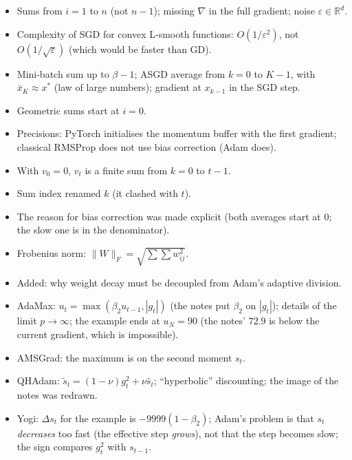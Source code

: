 \begin{itemize}
  \item Sums from $i=1$ to $n$ (not $n-1$); missing $\nabla$ in the full gradient; noise $\varepsilon\in\mathbb{R}^d$.
  \item Complexity of SGD for convex L-smooth functions: $O(1/\varepsilon^2)$, not $O(1/\sqrt\varepsilon)$ (which would be faster than GD).
  \item Mini-batch sum up to $\beta-1$; ASGD average from $k=0$ to $K-1$, with $\bar x_K\approx x^*$ (law of large numbers); gradient at $x_{k-1}$ in the SGD step.
\end{itemize}

\begin{itemize}
  \item Geometric sums start at $i=0$.
  \item Precisions: PyTorch initialises the momentum buffer with the first gradient; classical RMSProp does not use bias correction (Adam does).
\end{itemize}

\begin{itemize}
  \item With $v_0=0$, $v_t$ is a finite sum from $k=0$ to $t-1$.
\end{itemize}

\begin{itemize}
  \item Sum index renamed $k$ (it clashed with $t$).
  \item The reason for bias correction was made explicit (both averages start at 0; the slow one is in the denominator).
  \item Frobenius norm: $\lVert W\rVert_F=\sqrt{\sum\sum w_{ij}^2}$.
  \item Added: why weight decay must be decoupled from Adam's adaptive division.
\end{itemize}

\begin{itemize}
  \item AdaMax: $u_t=\max(\beta_2u_{t-1},|g_t|)$ (the notes put $\beta_2$ on $|g_t|$); details of the limit $p\to\infty$; the example ends at $u_N=90$ (the notes' $72.9$ is below the current gradient, which is impossible).
  \item AMSGrad: the maximum is on the second moment $s_t$.
  \item QHAdam: $\tilde s_t=(1-\nu)g_t^2+\nu\hat s_t$; ``hyperbolic'' discounting; the image of the notes was redrawn.
  \item Yogi: $\Delta s_t$ for the example is $-9999(1-\beta_2)$; Adam's problem is that $s_t$ \emph{decreases} too fast (the effective step \emph{grows}), not that the step becomes slow; the sign compares $g_t^2$ with $s_{t-1}$.
\end{itemize}

